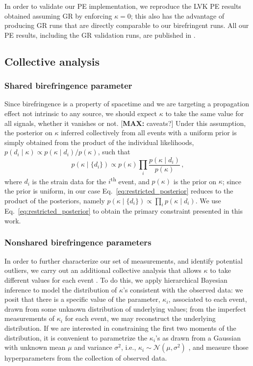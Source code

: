 \documentclass[aps,prd,twocolumn,superscriptaddress,preprintnumbers,floatfix,nofootinbib]{revtex4-2}
\newcommand*{\mi}[1]{\textsf{\color{magenta} [\textbf{MAX:} #1]}}
\begin{document}
In order to validate our \ac{PE} implementation, we reproduce the \ac{LVK} \ac{PE} results obtained assuming \ac{GR} by enforcing $\kappa = 0$; this also has the advantage of producing \ac{GR} runs that are directly comparable to our birefringent runs.
All our \ac{PE} results, including the \ac{GR} validation runs, are published in \citet{dataset}.

\subsection{Collective analysis}

\subsubsection{Shared birefringence parameter}

Since birefringence is a property of spacetime and we are targeting a propagation effect not intrinsic to any source, we should expect $\kappa$ to take the same value for all signals, whether it vanishes or not.
\mi{caveats?}
Under this assumption, the posterior on $\kappa$ inferred collectively from all events with a uniform prior is simply obtained from the product of the individual likelihoods, $p(d_i \mid \kappa) \propto p(\kappa \mid d_i)/p(\kappa)$, such that
\begin{equation}
    p(\kappa \mid \{d_i\})\propto p(\kappa) \prod_{i}\frac{p(\kappa \mid d_i)}{p(\kappa)}\,,
    \label{eq:restricted_posterior}
\end{equation}
where $d_i$ is the strain data for the $i$\textsuperscript{th} event, and $p(\kappa)$ is the prior on $\kappa$; since the prior is uniform, in our case Eq.~\eqref{eq:restricted_posterior} reduces to the product of the posteriors, namely $p(\kappa \mid \{d_i\}) \propto \prod_{i}p(\kappa \mid d_i)$.
We use Eq.~\eqref{eq:restricted_posterior} to obtain the primary constraint presented in this work.

\subsubsection{Nonshared birefringence parameters}

In order to further characterize our set of measurements, and identify potential outliers, we carry out an additional collective analysis that allows $\kappa$ to take different values for each event \cite{Zimmerman:2019wzo,Isi:2022cii}.
To do this, we apply hierarchical Bayesian inference \cite{Loredo:2004nn} to model the distribution of $\kappa$'s consistent with the observed data:
we posit that there is a specific value of the parameter, $\kappa_i$, associated to each event, drawn from some unknown distribution of underlying values; from the imperfect measurements of $\kappa_i$ for each event, we may reconstruct the underlying distribution.
If we are interested in constraining the first two moments of the distribution, it is convenient to parametrize the $\kappa_i$'s as drawn from a Gaussian with unknown mean $\mu$ and variance $\sigma^2$, i.e., $\kappa_i \sim \mathcal{N}(\mu, \sigma^2)$ \cite{Isi:2019asy}, and measure those hyperparameters from the collection of observed data.
\end{document}
